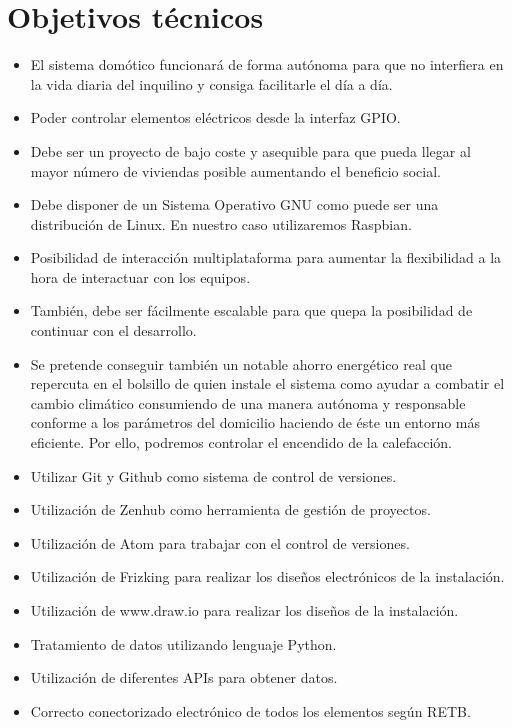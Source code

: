 \section{Objetivos técnicos}
\begin{itemize}
    \item El sistema domótico funcionará de forma autónoma para que no interfiera en la vida diaria del inquilino y consiga facilitarle el día a día.
    \item Poder controlar elementos eléctricos desde la interfaz GPIO.
    \item Debe ser un proyecto de bajo coste y asequible para que pueda llegar al mayor número de viviendas posible aumentando el beneficio social.
    \item Debe disponer de un Sistema Operativo GNU como puede ser una distribución de Linux. En nuestro caso utilizaremos Raspbian.
    \item Posibilidad de interacción multiplataforma para aumentar la flexibilidad a la hora de interactuar con los equipos.
    \item También, debe ser fácilmente escalable para que quepa la posibilidad de continuar con el desarrollo.
    \item Se pretende conseguir también un notable ahorro energético real que repercuta en el bolsillo de quien instale el sistema como ayudar a combatir el cambio climático consumiendo de una manera autónoma y responsable conforme a los parámetros del domicilio haciendo de éste un entorno más eficiente. Por ello, podremos controlar el encendido de la calefacción.
    \item Utilizar Git y Github como sistema de control de versiones.
    \item Utilización de Zenhub como herramienta de gestión de proyectos.
    \item Utilización de Atom para trabajar con el control de versiones.
    \item Utilización de Frizking para realizar los diseños electrónicos de la instalación.
    \item Utilización de www.draw.io para realizar los diseños de la instalación.
    \item Tratamiento de datos utilizando lenguaje Python.
    \item Utilización de diferentes APIs para obtener datos.
    \item Correcto conectorizado electrónico de todos los elementos según RETB.
\end{itemize}


